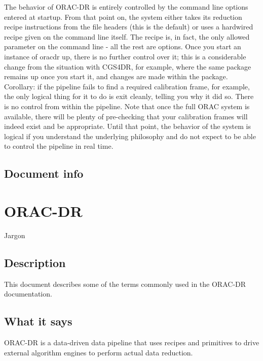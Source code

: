 \documentclass[twoside,11pt]{article}
\renewcommand{\_}{\texttt{\symbol{95}}}
\begin{document}
The behavior of ORAC-DR is entirely controlled by the command line
options entered at startup. From that point on, the system either
takes its reduction recipe instructions from the file headers (this is
the default) or uses a hardwired recipe given on the command line
itself. The recipe is, in fact, the only allowed parameter on the
command line - all the rest are options. Once you start an instance of
oracdr up, there is no further control over it; this is a considerable
change from the situation with CGS4DR, for example, where the same
package remains up once you start it, and changes are made within the
package. Corollary: if the pipeline fails to find a required
calibration frame, for example, the only logical thing for it to do is
exit cleanly, telling you why it did so. There is no control from
within the pipeline. Note that once the full ORAC system is available,
there will be plenty of pre-checking that your calibration frames will
indeed exist and be appropriate. Until that point, the behavior of
the system is logical if you understand the underlying philosophy and
do not expect to be able to control the pipeline in real time.

\subsection*{Document info\label{Introduction_to_ORAC-DR_Document_info}}

\section{ORAC-DR\label{ORAC-DR}}


Jargon

\subsection*{Description\label{ORAC-DR_Description}}


This document describes some of the terms commonly used in
the ORAC-DR documentation.

\subsection*{What it says\label{ORAC-DR_What_it_says}}


ORAC-DR is a data-driven data pipeline that uses recipes and
primitives to drive external algorithm engines to perform actual data
reduction.
\end{document}
